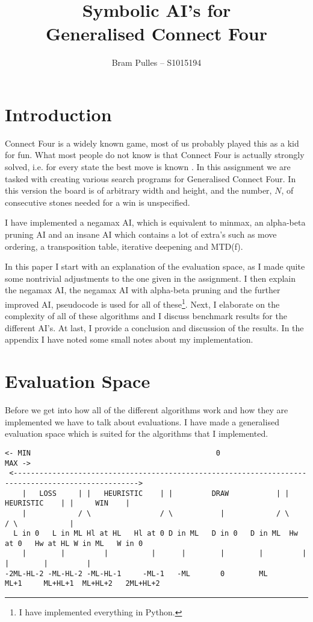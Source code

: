 \documentclass[a4paper]{article}
\author{Bram Pulles -- S1015194}
\title{\textbf{Symbolic AI's for\\ Generalised Connect Four}}
\begin{document}
\maketitle

\tableofcontents

\pagebreak
\section{Introduction}
Connect Four is a widely known game, most of us probably played this as a kid
for fun. What most people do not know is that Connect Four is actually strongly
solved, i.e. for every state the best move is known
\cite{wiki:strongly_solved}. In this assignment we are tasked with creating
various search programs for Generalised Connect Four. In this version the board
is of arbitrary width and height, and the number, $N$, of consecutive stones needed
for a win is unspecified.

I have implemented a negamax AI, which is equivalent to minmax, an alpha-beta
pruning AI and an insane AI which contains a lot of extra's such as move
ordering, a transposition table, iterative deepening and MTD(f).

In this paper I start with an explanation of the evaluation space, as I made
quite some nontrivial adjustments to the one given in the assignment. I then
explain the negamax AI, the negamax AI with alpha-beta pruning and the further
improved AI, pseudocode is used for all of these\footnote{I have implemented
everything in Python.}. Next, I elaborate on the complexity of all of these
algorithms and I discuss benchmark results for the different AI's. At last, I
provide a conclusion and discussion of the results. In the appendix I have
noted some small notes about my implementation.

\section{Evaluation Space}
Before we get into how all of the different algorithms work and how they are
implemented we have to talk about evaluations. I have made a generalised
evaluation space which is suited for the algorithms that I implemented.

\begin{lstlisting}[basicstyle = \ttfamily\tiny, columns = fixed]
 <- MIN                                           0                                             MAX ->
 <--------------------------------------------------------------------------------------------------->
    |   LOSS     | |   HEURISTIC    | |         DRAW           | |    HEURISTIC    | |     WIN    |
    |            / \                / \           |            / \                 / \            |
  L in 0   L in ML Hl at HL   Hl at 0 D in ML   D in 0   D in ML  Hw at 0   Hw at HL W in ML   W in 0
    |        |         |          |      |        |        |         |         |        |         |
-2ML-HL-2 -ML-HL-2 -ML-HL-1     -ML-1   -ML       0        ML      ML+1     ML+HL+1  ML+HL+2   2ML+HL+2
\end{lstlisting}
\end{document}
